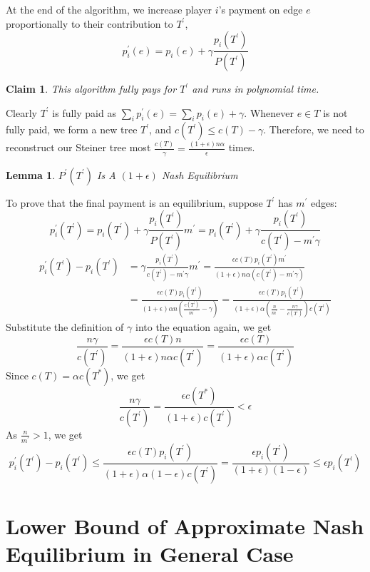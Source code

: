 \documentclass[11pt,psfig,times]{article}
\newtheorem{lemma}{Lemma}[section]
\newtheorem{claim}{Claim}
\begin{document}
		At the end of the algorithm, we increase player $i$'s payment on edge $e$ proportionally to their contribution to $T^{'}$, \[p_i^{'}(e) = p_i(e) + \gamma\frac{p_i(T^{'})}{P(T^{'})}\]
	
		\begin{claim}
			This algorithm fully pays for $T^{'}$ and runs in polynomial time.
		\end{claim}
	
		Clearly $T^{'}$ is fully paid as $\sum_i p_i^{'}(e) = \sum_i p_i(e) + \gamma$. Whenever \( e \in T \) is not fully paid, we form a new tree $T^{'}$, and $c(T^{'}) \leq c(T) - \gamma $. Therefore, we need to reconstruct our Steiner tree most  $\frac{c(T)}{\gamma} = \frac{(1+\epsilon)n\alpha }{\epsilon}$ times.

		\begin{lemma}
			$P^{'}(T^{'})$ Is A $(1+\epsilon)$ Nash Equilibrium
		\end{lemma}
		To prove that the final payment is an equilibrium, suppose $T^{'}$ has $m^{'}$ edges:
		\[p_i^{'}(T^{'}) = p_i(T^{'}) + \gamma\frac{p_i(T^{'})}{P(T^{'})}m^{'} = p_i(T^{'}) + \gamma\frac{p_i(T^{'})}{c(T^{'}) - m^{'}\gamma}\]
		\begin{align*}
		p_i^{'}(T^{'}) - p_i(T^{'}) &=  \gamma\frac{p_i(T^{'})}{c(T^{'}) - m^{'}\gamma}m^{'} = \frac{\epsilon c(T) p_i(T^{'}) m^{'} }{(1+\epsilon)n\alpha(c(T^{'}) - m^{'}\gamma)}  \\ &=  \frac{\epsilon c(T) p_i(T^{'})}{(1+\epsilon)\alpha n(\frac{c(T^{'})}{m^{'}} - \gamma)} =  \frac{\epsilon c(T) p_i(T^{'})}{(1+\epsilon)\alpha (\frac{n}{m^{'}} - \frac{n\gamma}{c(T^{'})})c(T^{'})}   
		\end{align*}
		Substitute the definition of $\gamma$ into the equation again, we get
		\[\frac{n\gamma}{c(T^{'})} = \frac{\epsilon c(T) n}{(1+\epsilon)n\alpha c(T^{'})} = \frac{\epsilon c(T) }{(1+\epsilon)\alpha c(T^{'})}\]
		Since $c(T) = \alpha c(T^*)$, we get \[ \frac{n\gamma}{c(T^{'})} = \frac{\epsilon c(T^*)}{(1+\epsilon)c(T^{'})} < \epsilon\]
		As $\frac{n}{m^{'}} > 1$, we get
		\[p_i^{'}(T^{'}) - p_i(T^{'}) \leq \frac{\epsilon c(T) p_i(T^{'}) }{(1+\epsilon)\alpha (1-\epsilon) c(T^{'}) } = \frac{\epsilon  p_i(T^{'}) }{(1+\epsilon) (1-\epsilon) } \leq \epsilon p_i(T^{'})\]
	
		
\section{Lower Bound of Approximate Nash Equilibrium in General Case}
	
\end{document}
